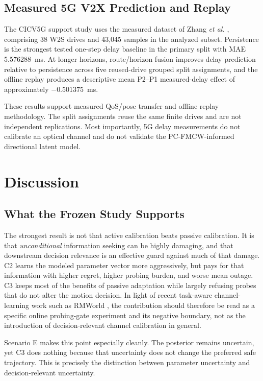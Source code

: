 \documentclass[journal]{IEEEtran}
\begin{document}
\subsection{Measured 5G V2X Prediction and Replay}
The CICV5G support study uses the measured dataset of Zhang \emph{et al.} \cite{zhang2026}, comprising 38 W2S drives and 43,045 samples in the analyzed subset. Persistence is the strongest tested one-step delay baseline in the primary split with MAE 5.576288~ms. At longer horizons, route/horizon fusion improves delay prediction relative to persistence across five reused-drive grouped split assignments, and the offline replay produces a descriptive mean P2--P1 measured-delay effect of approximately $-0.501375$~ms.

These results support measured QoS/pose transfer and offline replay methodology. The split assignments reuse the same finite drives and are not independent replications. Most importantly, 5G delay measurements do not calibrate an optical channel and do not validate the PC-FMCW-informed directional latent model.

\section{Discussion}
\subsection{What the Frozen Study Supports}
The strongest result is not that active calibration beats passive calibration. It is that \emph{unconditional} information seeking can be highly damaging, and that downstream decision relevance is an effective guard against much of that damage. C2 learns the modeled parameter vector more aggressively, but pays for that information with higher regret, higher probing burden, and worse mean outage. C3 keeps most of the benefits of passive adaptation while largely refusing probes that do not alter the motion decision. In light of recent task-aware channel-learning work such as RMWorld \cite{wang2026rmworld}, the contribution should therefore be read as a specific online probing-gate experiment and its negative boundary, not as the introduction of decision-relevant channel calibration in general.

Scenario E makes this point especially cleanly. The posterior remains uncertain, yet C3 does nothing because that uncertainty does not change the preferred safe trajectory. This is precisely the distinction between parameter uncertainty and decision-relevant uncertainty.
\end{document}
